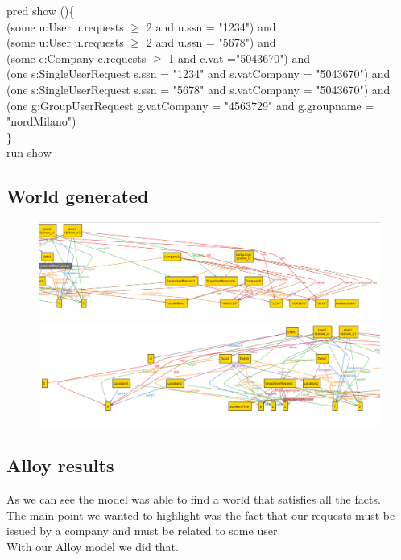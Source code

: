 \documentclass{article}
\begin{document}
pred show ()\{\\
(some u:User \textbar \space u.requests $\geq$ 2 and u.ssn = "1234") and\\
(some u:User \textbar \space u.requests $\geq$ 2 and u.ssn = "5678") and\\
(some c:Company \textbar \space c.requests $\geq$ 1 and c.vat ="5043670") and \\
(one s:SingleUserRequest \textbar \space s.ssn = "1234" and s.vatCompany = "5043670") and\\
(one s:SingleUserRequest \textbar \space s.ssn = "5678" and s.vatCompany = "5043670") and\\
(one g:GroupUserRequest \textbar \space g.vatCompany = "4563729" and g.groupname = "nordMilano")\\
\}\\
run show\\
\newpage
\subsection{World generated}
\begin{figure}[h!]
	\includegraphics[width= \linewidth]{world1.png}
	\includegraphics[width= \linewidth]{world2.png}
\end{figure}
\newpage
\subsection{Alloy results}
As we can see the model was able to find a world that satisfies all the facts. \\
The main point we wanted to highlight was the fact that our requests must be issued by a company and must be related to some user. \\
With our Alloy model we did that.
\newpage
\end{document}
